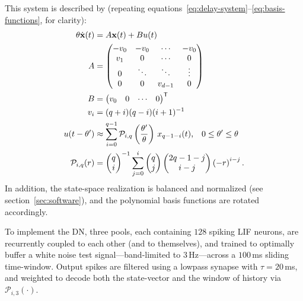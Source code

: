 This system is described by (repeating equations~\ref{eq:delay-system}--\ref{eq:basis-functions}, for clarity):
\begin{equation*}
\begin{aligned}
  \theta \dot{\V{x}}(t) &= A\V{x}(t) + Bu(t) \\
  A &= \begin{pmatrix} -v_0 & -v_0 & \cdots & -v_0 \\ v_1 & 0 & \cdots & 0 \\ 0 & \ddots & \ddots & \vdots \\ 0 & 0 & v_{d-1} & 0\end{pmatrix} \\
  B &= \transpose{\begin{pmatrix} v_0 & 0 & \cdots & 0\end{pmatrix}} \\
 v_i &= (q+i)(q-i)(i+1)^{-1} \\ %
  u(t - \theta') &\approx \sum_{i=0}^{q-1} \mathcal{P}_{i,q} \left(\frac{\theta'}{\theta} \right) \, x_{q-1-i}(t) \text{,} \quad 0 \le \theta' \le \theta \\
\mathcal{P}_{i,q}(r) &= \begin{pmatrix}q \\ i\end{pmatrix}^{-1} \sum_{j=0}^i \begin{pmatrix}q \\ j\end{pmatrix} \begin{pmatrix}2q - 1 - j \\ i - j\end{pmatrix} \left( -r \right)^{i - j} \text{.} %
\end{aligned}
\end{equation*}
In addition, the state-space realization is balanced and normalized (see section~\ref{sec:software}), and the polynomial basis functions are rotated accordingly.


To implement the DN, three pools, each containing $128$ spiking LIF neurons, are recurrently coupled to each other (and to themselves), and trained to optimally buffer a white noise test signal---band-limited to $3$\,Hz---across a $100$\,ms sliding time-window.
Output spikes are filtered using a lowpass synapse with $\tau = 20$\,ms, and weighted to decode both the state-vector and the window of history via $\mathcal{P}_{i, 3}(\cdot)$. %

